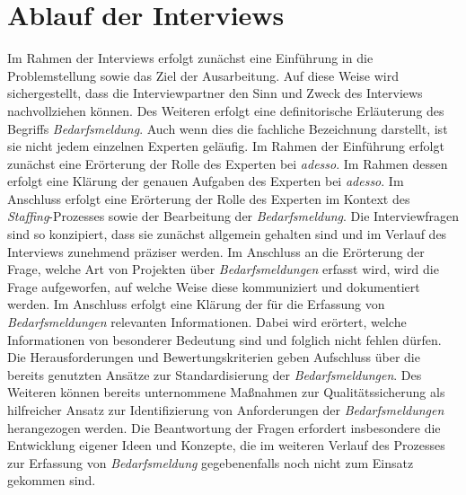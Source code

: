 \section{Ablauf der Interviews}
Im Rahmen der Interviews erfolgt zunächst eine Einführung in die Problemstellung sowie das Ziel der Ausarbeitung. Auf diese Weise wird sichergestellt, dass die Interviewpartner den Sinn und Zweck des Interviews nachvollziehen können. Des Weiteren erfolgt eine definitorische Erläuterung des Begriffs \emph{Bedarfsmeldung}. Auch wenn dies die fachliche Bezeichnung darstellt, ist sie nicht jedem einzelnen Experten geläufig. Im Rahmen der Einführung erfolgt zunächst eine Erörterung der Rolle des Experten bei \emph{adesso}. Im Rahmen dessen erfolgt eine Klärung der genauen Aufgaben des Experten bei \emph{adesso}. Im Anschluss erfolgt eine Erörterung der Rolle des Experten im Kontext des \emph{Staffing}-Prozesses sowie der Bearbeitung der \emph{Bedarfsmeldung}. Die Interviewfragen sind so konzipiert, dass sie zunächst allgemein gehalten sind und im Verlauf des Interviews zunehmend präziser werden. Im Anschluss an die Erörterung der Frage, welche Art von Projekten über \emph{Bedarfsmeldungen} erfasst wird, wird die Frage aufgeworfen, auf welche Weise diese kommuniziert und dokumentiert werden. Im Anschluss erfolgt eine Klärung der für die Erfassung von \emph{Bedarfsmeldungen} relevanten Informationen. Dabei wird erörtert, welche Informationen von besonderer Bedeutung sind und folglich nicht fehlen dürfen. Die Herausforderungen und Bewertungskriterien geben Aufschluss über die bereits genutzten Ansätze zur Standardisierung der \emph{Bedarfsmeldungen}. Des Weiteren können bereits unternommene Maßnahmen zur Qualitätssicherung als hilfreicher Ansatz zur Identifizierung von Anforderungen der \emph{Bedarfsmeldungen} herangezogen werden. Die Beantwortung der Fragen erfordert insbesondere die Entwicklung eigener Ideen und Konzepte, die im weiteren Verlauf des Prozesses zur Erfassung von \emph{Bedarfsmeldung} gegebenenfalls noch nicht zum Einsatz gekommen sind.
